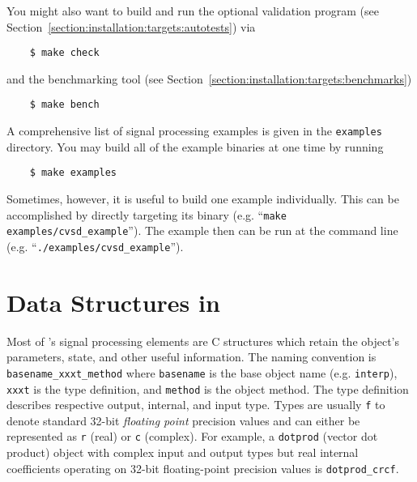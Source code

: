 %
You might also want to build and run the optional validation program
(see Section~\ref{section:installation:targets:autotests}) via
\begin{verbatim}
    $ make check
\end{verbatim}
and the benchmarking tool
(see Section~\ref{section:installation:targets:benchmarks})
\begin{verbatim}
    $ make bench
\end{verbatim}
%
A comprehensive list of signal processing examples is given in the
{\tt examples} directory.
You may build all of the example binaries at one time by running
\begin{verbatim}
    $ make examples
\end{verbatim}
%
Sometimes, however, it is useful to build one example individually.
This can be accomplished by directly targeting its binary
(e.g. ``{\tt make examples/cvsd\_example}'').
The example then can be run at the command line
(e.g. ``{\tt ./examples/cvsd\_example}'').

%
%
\section{Data Structures in \liquid}
\label{section:data_structures}
Most of \liquid's signal processing elements are C structures which
retain the object's parameters, state, and other useful information.
The naming convention is
{\tt basename\_xxxt\_method} where
{\tt basename} is the base object name (e.g. {\tt interp}),
{\tt xxxt} is the type definition, and
{\tt method} is the object method.
The type definition describes respective output, internal, and input type.
Types are usually {\tt f} to denote standard 32-bit {\it floating point}
precision values and can either be represented as {\tt r} (real) or {\tt c}
(complex).
For example, a {\tt dotprod} (vector dot product) object with complex input
and output types but real internal coefficients operating on 32-bit
floating-point precision values is {\tt dotprod\_crcf}.

